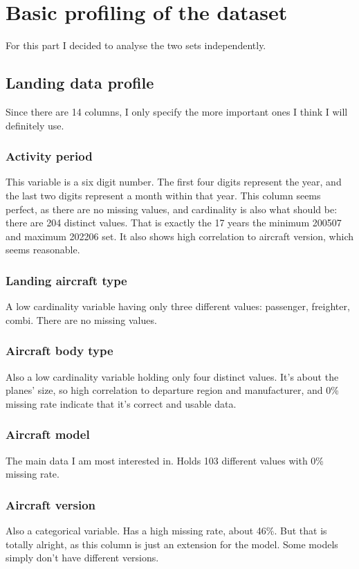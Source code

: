 \documentclass[a4paper,11pt]{article}
\begin{document}
    \section{Basic profiling of the dataset}
    For this part I decided to analyse the two sets independently.


    \subsection{Landing data profile}
    Since there are 14 columns, I only specify the more important ones I think I will definitely use.

        \subsubsection{Activity period}
        This variable is a six digit number. The first four digits represent the year, and the last
        two digits represent a month within that year. This column seems perfect, as there are no 
        missing values, and cardinality is also what should be: there are 204 distinct values. That is
        exactly the 17 years the minimum 200507 and maximum 202206 set. It also shows high correlation to
        aircraft version, which seems reasonable.

        \subsubsection{Landing aircraft type}
        A low cardinality variable having only three different values: passenger, freighter, combi.
        There are no missing values.

        \subsubsection{Aircraft body type}
        Also a low cardinality variable holding only four distinct values. It's about the planes' size,
        so high correlation to departure region and manufacturer, and 0\% missing rate indicate that
        it's correct and usable data.

        \subsubsection{Aircraft model}
        The main data I am most interested in. Holds 103 different values with 0\% missing rate.

        \subsubsection{Aircraft version}
        Also a categorical variable. Has a high missing rate, about 46\%. But that is totally alright,
        as this column is just an extension for the model. Some models simply don't have different versions.
\end{document}
